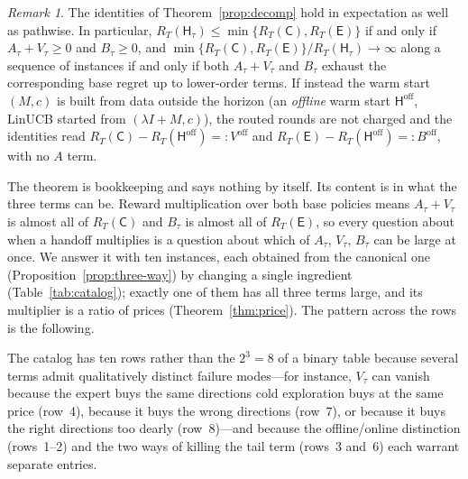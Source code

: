 \documentclass{article}
\theoremstyle{definition}
\theoremstyle{remark}
\newtheorem{remark}{Remark}
\theoremstyle{remark}
\newcommand{\Cold}{\mathsf{C}}
\newcommand{\Exp}{\mathsf{E}}
\newcommand{\Hyb}{\mathsf{H}}
\begin{document}
\begin{remark}
The identities of Theorem~\ref{prop:decomp} hold in expectation as well as
pathwise. In particular, $R_T(\Hyb_\tau)\le\min\{R_T(\Cold),R_T(\Exp)\}$ if
and only if $A_\tau+V_\tau\ge0$ and $B_\tau\ge0$, and
$\min\{R_T(\Cold),R_T(\Exp)\}/R_T(\Hyb_\tau)\to\infty$ along a sequence of
instances if and only if both $A_\tau+V_\tau$ and $B_\tau$ exhaust the
corresponding base regret up to lower-order terms. If instead the warm start
$(M,c)$ is built from data outside the horizon (an \emph{offline} warm start
$\Hyb^{\mathrm{off}}$, LinUCB started from $(\lambda I+M,c)$), the routed
rounds are not charged and the identities read
$R_T(\Cold)-R_T(\Hyb^{\mathrm{off}})=:V^{\mathrm{off}}$ and
$R_T(\Exp)-R_T(\Hyb^{\mathrm{off}})=:B^{\mathrm{off}}$, with no $A$ term.
\end{remark}

The theorem is bookkeeping and says nothing by itself. Its content is in
what the three terms can be. Reward multiplication over both base policies
means $A_\tau+V_\tau$ is almost all of $R_T(\Cold)$ and $B_\tau$ is almost all
of $R_T(\Exp)$, so every question about when a handoff multiplies is a
question about which of $A_\tau$, $V_\tau$, $B_\tau$ can be large at once. We
answer it with ten instances, each obtained from the canonical one
(Proposition~\ref{prop:three-way}) by changing a single ingredient
(Table~\ref{tab:catalog}); exactly one of them has all three terms large,
and its multiplier is a ratio of prices (Theorem~\ref{thm:price}). The
pattern across the rows is the following.


\begin{center}
\end{center}

The catalog has ten rows rather than the $2^3=8$ of a binary table because
several terms admit qualitatively distinct failure modes---for instance,
$V_\tau$ can vanish because the expert buys the same directions cold
exploration buys at the same price (row~4), because it buys the wrong
directions (row~7), or because it buys the right directions too dearly
(row~8)---and because the offline/online distinction (rows~1--2) and the two
ways of killing the tail term (rows~3 and~6) each warrant separate entries.
\end{document}
